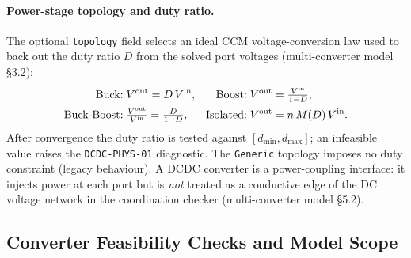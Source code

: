 \paragraph{Power-stage topology and duty ratio.}
The optional \texttt{topology} field selects an ideal CCM voltage-conversion law
used to back out the duty ratio \(D\) from the solved port voltages
(multi-converter model \S3.2):
\begin{align}
\text{Buck:}\;& V^{\mathrm{out}}=D\,V^{\mathrm{in}}, &
\text{Boost:}\;& V^{\mathrm{out}}=\tfrac{V^{\mathrm{in}}}{1-D}, \\
\text{Buck-Boost:}\;& \tfrac{V^{\mathrm{out}}}{V^{\mathrm{in}}}=\tfrac{D}{1-D}, &
\text{Isolated:}\;& V^{\mathrm{out}}=n\,M(D)\,V^{\mathrm{in}}.
\end{align}
After convergence the duty ratio is tested against \([d_{\min},d_{\max}]\); an
infeasible value raises the \texttt{DCDC-PHYS-01} diagnostic.  The
\texttt{Generic} topology imposes no duty constraint (legacy behaviour).  A DCDC
converter is a power-coupling interface: it injects power at each port but is
\emph{not} treated as a conductive edge of the DC voltage network in the
coordination checker (multi-converter model \S5.2).

\subsection{Converter Feasibility Checks and Model Scope}
\label{sec:pf-converter-feasibility}


